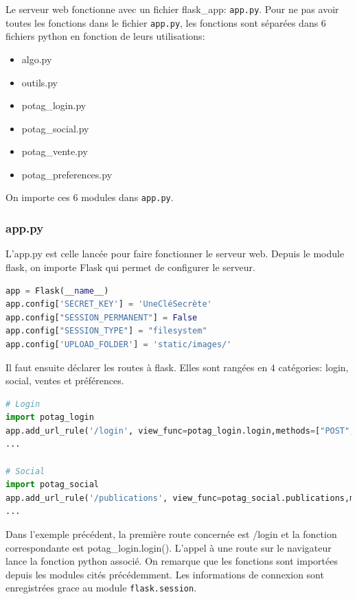 \documentclass[11pt]{article}
\begin{document}
Le serveur web fonctionne avec un fichier flask\_app: \texttt{app.py}. 
Pour ne pas avoir toutes les fonctions dans le fichier \texttt{app.py}, les fonctions sont séparées dans 6 fichiers python en fonction de leurs utilisations:

\begin{itemize} 
\item algo.py
\item outils.py
\item potag\_login.py
\item potag\_social.py
\item potag\_vente.py
\item potag\_preferences.py
\end{itemize} 

On importe ces 6 modules dans \texttt{app.py}.

\subsubsection{app.py}

L'app.py est celle lancée pour faire fonctionner le serveur web. Depuis le module flask, on importe Flask qui permet de configurer le serveur.
\begin{lstlisting}[language=Python, caption={Code Python permettant de configurer le serveur}]
app = Flask(__name__)
app.config['SECRET_KEY'] = 'UneCléSecrète'
app.config["SESSION_PERMANENT"] = False
app.config["SESSION_TYPE"] = "filesystem"
app.config['UPLOAD_FOLDER'] = 'static/images/'

\end{lstlisting}

Il faut ensuite déclarer les routes à flask. Elles sont rangées en 4 catégories: login, social, ventes et préférences.

\begin{lstlisting}[language=Python, caption={Code Python permettant de déclarer la route \texttt{login} et \texttt{publications}}]
# Login
import potag_login
app.add_url_rule('/login', view_func=potag_login.login,methods=["POST", "GET"]
...

# Social
import potag_social
app.add_url_rule('/publications', view_func=potag_social.publications,methods=["POST", "GET"]
...
\end{lstlisting}

Dans l'exemple précédent, la première route concernée est /login et la fonction correspondante est potag\_login.login(). 
L'appel à une route sur le navigateur lance la fonction python associé.
On remarque que les fonctions sont importées depuis les modules cités précédemment.
Les informations de connexion sont enregistrées grace au module \texttt{flask.session}.
\end{document}
